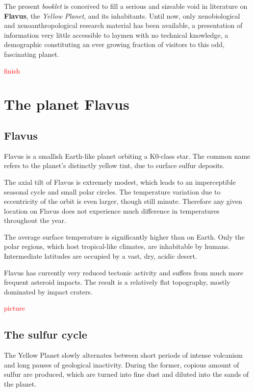 \documentclass[10pt,oneside]{memoir}
\newcommand{\cmmnt}[1]{\textcolor{red}{#1}}
\begin{document}
The present \emph{booklet} is conceived to fill a serious and sizeable void in literature on \textbf{Flavus}, the \emph{Yellow Planet}, and its inhabitants. Until now, only xenobiological and xenoanthropological research material has been available, a presentation of information very little accessible to laymen with no technical knowledge, a demographic constituting an ever growing fraction of visitors to this odd, fascinating planet.

\cmmnt{finish}

\tableofcontents

\chapter{The planet Flavus}

\section{Flavus}

Flavus is a smallish Earth-like planet orbiting a K0-class star. The common name refers to the planet's distinctly yellow tint, due to surface sulfur deposits.

The axial tilt of Flavus is extremely modest, which leads to an imperceptible seasonal cycle and small polar circles. The temperature variation due to eccentricity of the orbit is even larger, though still minute. Therefore any given location on Flavus does not experience much difference in temperatures throughout the year.

The average surface temperature is significantly higher than on Earth. Only the polar regions, which host tropical-like climates, are inhabitable by humans. Intermediate latitudes are occupied by a vast, dry, acidic desert.

Flavus has currently very reduced tectonic activity and suffers from much more frequent asteroid impacts. The result is a relatively flat topography, mostly dominated by impact craters.

\cmmnt{picture}


\vfill
\section{The sulfur cycle}

The Yellow Planet slowly alternates between short periods of intense volcanism and long pauses of geological inactivity. During the former, copious amount of sulfur are produced, which are turned into fine dust and diluted into the sands of the planet.
\end{document}
